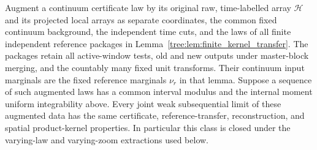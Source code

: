 \begin{lemma}\label{tree:lem:certificate_class_closed}
Augment a continuum certificate law by its original raw, time-labelled
array $\mathcal H$ and its projected local arrays as separate coordinates,
the common fixed continuum background, the independent
time cuts, and the laws of all finite independent reference packages
in Lemma~\ref{tree:lem:finite_kernel_transfer}.  The packages retain all
active-window tests, old and new outputs under master-block merging,
and the countably many fixed unit transforms.  Their continuum input
marginals are the fixed reference marginals $\nu_r$ in that lemma.
Suppose a sequence of such augmented laws has a common interval
modulus and the internal moment uniform integrability above.  Every
joint weak subsequential limit of these augmented data has the same
certificate, reference-transfer, reconstruction, and spatial
product-kernel properties.  In particular this class is closed
under the varying-law and varying-zoom extractions used below.
\end{lemma}

